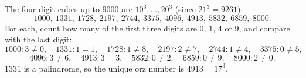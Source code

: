 The four-digit cubes up to $9000$ are $10^3,\dots,20^3$ (since $21^3=9261$):
\[1000,\ 1331,\ 1728,\ 2197,\ 2744,\ 3375,\ 4096,\ 4913,\ 5832,\ 6859,\ 8000.\]
For each, count how many of the first three digits are $0$, $1$, $4$ or $9$, and compare with the last digit:
\[1000:3\ne0,\quad 1331:1=1,\quad 1728:1\ne8,\quad 2197:2\ne7,\quad 2744:1\ne4,\quad 3375:0\ne5,\]
\[4096:3\ne6,\quad 4913:3=3,\quad 5832:0\ne2,\quad 6859:0\ne9,\quad 8000:2\ne0.\]
$1331$ is a palindrome, so the unique orz number is $\boxed{4913}=17^3$.

